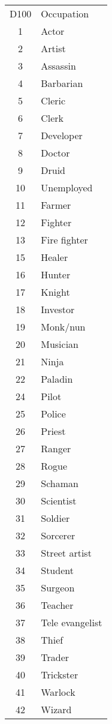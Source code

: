 \documentclass[11pt,a4paper,twocolumn]{article}
\begin{document}
\begin{tabular}{cl}
    \rowcolor{gray!50}
    D100 & Occupation\\
    1 & Actor\\
    2 & Artist\\
    3 & Assassin\\
    4 & Barbarian\\
    5 & Cleric\\
    6 & Clerk\\
    7 & Developer\\
    8 & Doctor\\
    9 & Druid\\
    10 & Unemployed\\
    11 & Farmer\\
    12 & Fighter\\
    13 & Fire fighter\\
    15 & Healer\\
    16 & Hunter\\
    17 & Knight\\
    18 & Investor\\
    19 & Monk/nun\\
    20 & Musician\\
    21 & Ninja\\
    22 & Paladin\\
    24 & Pilot\\
    25 & Police\\
    26 & Priest\\
    27 & Ranger\\
    28 & Rogue\\
    29 & Schaman\\
    30 & Scientist\\
    31 & Soldier\\
    32 & Sorcerer\\
    33 & Street artist\\
    34 & Student\\
    35 & Surgeon\\
    36 & Teacher\\
    37 & Tele evangelist\\
    38 & Thief\\
    39 & Trader\\
    40 & Trickster\\
    41 & Warlock\\
    42 & Wizard\\
\end{tabular}
\end{document}

